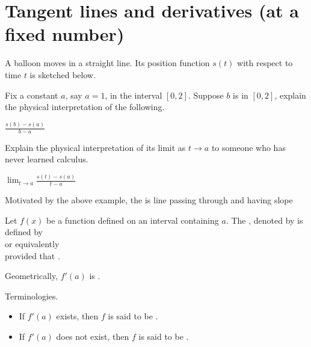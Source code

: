 \documentclass[../main.tex]{subfiles}
\begin{document}
 \section{Tangent lines and derivatives (at a fixed number)}
A balloon moves in a straight line. Its position function \(s(t)\) with respect to time \(t\) is sketched below. 

\begin{center}
  
\end{center}

Fix a constant \(a\), say \(a = 1\), in the interval \([0,2]\). Suppose \(b\) is in \([0,2]\), explain the physical interpretation of the following. 

\(\frac{s(b) - s(a)}{b - a}\)


Explain the physical interpretation of its limit as \(t \to a\) to someone who has never learned calculus. 

\(\lim_{t \to a} \frac{s(t) - s(a)}{t - a}\)


Motivated by the above example, the  is \underline{\hspace{2cm}} line passing through \underline{\hspace{2in}} and having slope 


\begin{mdframed}[style=simple]
  Let \(f(x)\) be a function defined on an \underline{\hspace{1in}} interval containing \(a\). The , denoted by  is defined by
  \begin{equation}\label{eq:def-derivative-1}
  \end{equation}
  or equivalently 
  \begin{equation}\label{eq:def-derivative-2}
  \end{equation}
  provided that \underline{\hspace{2in}}.

\end{mdframed}

\faStar{} Geometrically, \(f'(a)\) is \underline{\hspace{5in}}.

Terminologies. 
\begin{itemize}
  \item If \(f'(a)\) exists, then \(f\) is said to be .
  \item If \(f'(a)\) does not exist, then \(f\) is said to be .
\end{itemize}
\end{document}
